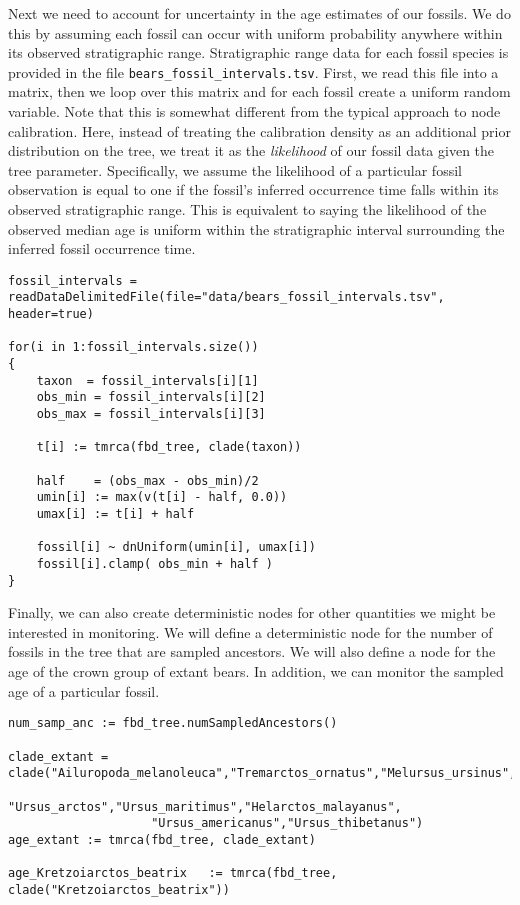 Next we need to account for uncertainty in the age estimates of our fossils.
We do this by assuming each fossil can occur with uniform probability anywhere within its observed stratigraphic range.
Stratigraphic range data for each fossil species is provided in the file \verb+bears_fossil_intervals.tsv+.
First, we read this file into a matrix, then we loop over this matrix and for each fossil create a uniform random variable.
Note that this is somewhat different from the typical approach to node calibration.
Here, instead of treating the calibration density as an additional prior distribution on the tree, we treat it as the \textit{likelihood} of our fossil data given the tree parameter.
Specifically, we assume the likelihood of a particular fossil observation is equal to one if the fossil's inferred occurrence time falls within its observed stratigraphic range.
This is equivalent to saying the likelihood of the observed median age is uniform within the stratigraphic interval surrounding the inferred fossil occurrence time.

{\tt \begin{snugshade*}
\begin{lstlisting}
fossil_intervals = readDataDelimitedFile(file="data/bears_fossil_intervals.tsv", header=true)

for(i in 1:fossil_intervals.size())
{
    taxon  = fossil_intervals[i][1]
    obs_min = fossil_intervals[i][2]
    obs_max = fossil_intervals[i][3]
    
    t[i] := tmrca(fbd_tree, clade(taxon))
    
    half    = (obs_max - obs_min)/2
    umin[i] := max(v(t[i] - half, 0.0))
    umax[i] := t[i] + half
    
    fossil[i] ~ dnUniform(umin[i], umax[i])
    fossil[i].clamp( obs_min + half )
}
\end{lstlisting}
\end{snugshade*}}

Finally, we can also create deterministic nodes for other quantities we might be interested in monitoring. 
We will define a deterministic node for the number of fossils in the tree that are sampled ancestors. 
We will also define a node for the age of the crown group of extant bears.
In addition, we can monitor the sampled age of a particular fossil.

{\tt \begin{snugshade*}
\begin{lstlisting}
num_samp_anc := fbd_tree.numSampledAncestors()

clade_extant = clade("Ailuropoda_melanoleuca","Tremarctos_ornatus","Melursus_ursinus",
                    "Ursus_arctos","Ursus_maritimus","Helarctos_malayanus",
                    "Ursus_americanus","Ursus_thibetanus")
age_extant := tmrca(fbd_tree, clade_extant)

age_Kretzoiarctos_beatrix   := tmrca(fbd_tree, clade("Kretzoiarctos_beatrix"))
\end{lstlisting}
\end{snugshade*}}

